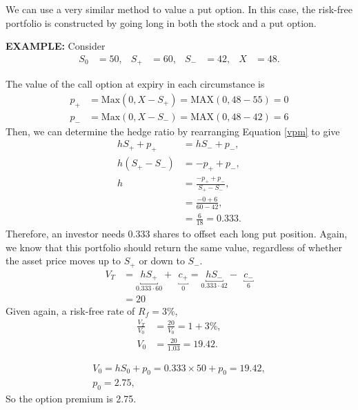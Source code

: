 \documentclass[../notes_compiled.tex]{subfiles}
\begin{document}
\begin{itemize}
\item We can use a very similar method to value a put option. In this case, the risk-free portfolio is constructed by going long in both the stock and a put option.

{\color{RedViolet}
\item[] \textbf{EXAMPLE:} Consider
\begin{align*}
S_{0}&=50, & S_{+}&=60, & S_{-}&=42, & X&=48.
\end{align*}
}
{\color{RoyalBlue}
The value of the call option at expiry in each circumstance is
\begin{align*}
p_{+}&=\text{Max}(0,X-S_{+})=\text{MAX}(0, 48-55)=0 \\
p_{-}&=\text{Max}(0,X-S_{-})=\text{MAX}(0, 48-42)=6
\end{align*}
Then, we can determine the hedge ratio by rearranging Equation \ref{vpm} to give
\begin{align*}
hS_{+} + p_{+} &=hS_{-}+p_{-}, \\
h(S_{+} - S_{-})&=-p_{+} + p_{-}, \\
h&=\frac{-p_{+}+p_{-}}{S_{+}-S_{-}}, \\
&=\frac{-0+6}{60-42}, \\
&= \frac{6}{18} = 0.333.
\end{align*}
Therefore, an investor needs 0.333 shares to offset each long put position. Again, we know that this portfolio should return the same value, regardless of whether the asset price moves up to $S_{+}$ or down to $S_{-}$.
\begin{align*}
V_{T} &=\underbracket{hS_{+}}_{0.333\cdot60}+\phantom{,}\underbracket{c_{+}}_{0} = \underbracket{hS_{-}}_{0.333\cdot42}-\phantom{,}\underbracket{c_{-}}_{6} \\
&=20
\end{align*}
Given again, a risk-free rate of $R_{f}=3\%$, 
\begin{align*}
\frac{V_{T}}{V_{0}} &= \frac{20}{V_{0}} = 1+3\%, \\
V_{0}&=\frac{20}{1.03}=19.42.
\end{align*}

\begin{gather*}
V_{0}=hS_{0}+p_{0} = 0.333\times50 +p_{0} = 19.42, \\
p_{0}=2.75,
\end{gather*}
So the option premium is 2.75.
}

\end{itemize}
\end{document}
